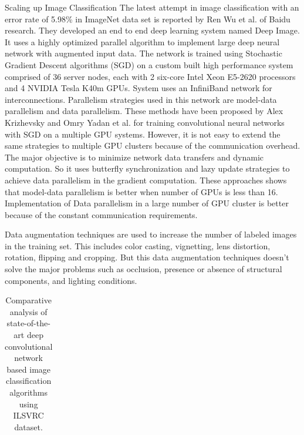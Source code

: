\documentclass[a4paper]{article}
\begin{document}
\begin{subsection}{Scaling up Image Classification}
The latest attempt in image classification with an error rate of 5.98\% in ImageNet data set is reported by Ren Wu et al. \cite{Wu2015} of Baidu research. They developed an end to end deep learning  system named Deep Image. It uses a highly optimized parallel algorithm to implement large deep neural network with augmented input data. The network is trained using Stochastic Gradient Descent algorithms (SGD) on a custom built high performance system comprised of 36 server nodes, each with 2 six-core Intel Xeon E5-2620 processors and 4 NVIDIA Tesla K40m GPUs. System  uses an InfiniBand  network for interconnections. Parallelism strategies used in this network are model-data parallelism and data parallelism. These methods have been proposed by Alex Krizhevsky \cite{Krizhevsky2014} and Omry Yadan et al. \cite{Yadan2013} for training convolutional neural networks with SGD on a  multiple GPU systems. However, it is not easy to extend the same strategies to multiple GPU clusters because of the communication overhead. The major objective is to minimize network data transfers and dynamic computation. So it uses butterfly synchronization and lazy update strategies to achieve data parallelism in the gradient computation. These approaches shows that model-data parallelism is better when number of GPUs is less than 16. Implementation of Data parallelism in a large number of GPU cluster is better because of the constant communication requirements.
\par
Data augmentation techniques are used to increase the number of labeled images in the training set. This includes color casting, vignetting, lens distortion, rotation, flipping and cropping. But this data augmentation techniques  doesn't solve the major problems such as occlusion, presence or absence of structural components, and lighting conditions.
\centering
\begin{table}[ht]
\captionsetup{justification=centering,belowskip=2pt,aboveskip=2pt}
\caption[]{ Comparative analysis of state-of-the-art deep convolutional network based image classification algorithms using ILSVRC dataset.}
 \begin{tabular}{ | p{2.7cm} | l | p{1.4cm} |p{1.3cm} |p{.8cm} |p{1.3cm} |p{1.1cm} |p{5cm}|}


\end{tabular}
\end{table}
\end{subsection}
\end{document}
